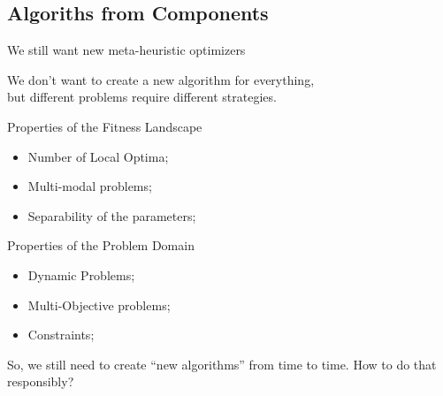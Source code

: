 \documentclass[aspectratio=169]{beamer}
\begin{document}
\subsection{Algoriths from Components}
\begin{frame}{We still want new meta-heuristic optimizers}

  \begin{block}{}
    \begin{center}
      We don't want to create a new algorithm for everything,\\
      but different problems require different strategies.
    \end{center}
  \end{block}

  \begin{block}{Properties of the Fitness Landscape}
    \begin{itemize}
      \item Number of Local Optima;
      \item Multi-modal problems;
      \item Separability of the parameters;
    \end{itemize}
  \end{block}
  \begin{block}{Properties of the Problem Domain}
    \begin{itemize}
      \item Dynamic Problems;
      \item Multi-Objective problems;
      \item Constraints;
    \end{itemize}
  \end{block}\bigskip

  So, we still need to create ``new algorithms'' from time to time. How to do that responsibly?
\end{frame}
\end{document}

